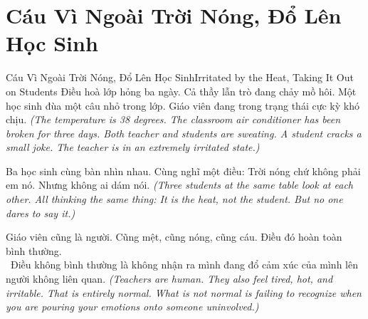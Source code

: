 \section{Cáu Vì Ngoài Trời Nóng, Đổ Lên Học Sinh}
\begin{truyen}{Cáu Vì Ngoài Trời Nóng, Đổ Lên Học Sinh}{Irritated by the Heat, Taking It Out on Students}
 Điều hoà lớp hỏng ba ngày. Cả thầy lẫn trò đang chảy mồ hôi. Một học sinh đùa một câu nhỏ trong lớp. Giáo viên đang trong trạng thái cực kỳ khó chịu.
\textit{(The temperature is 38 degrees. The classroom air conditioner has been broken for three days. Both teacher and students are sweating. A student cracks a small joke. The teacher is in an extremely irritated state.)}




Ba học sinh cùng bàn nhìn nhau. Cùng nghĩ một điều: Trời nóng chứ không phải em nó. Nhưng không ai dám nói.
\textit{(Three students at the same table look at each other. All thinking the same thing: It is the heat, not the student. But no one dares to say it.)}

\begin{baihoc}
Giáo viên cũng là người. Cũng mệt, cũng nóng, cũng cáu. Điều đó hoàn toàn bình thường.\\\
Điều không bình thường là không nhận ra mình đang đổ cảm xúc của mình lên người không liên quan.
\textit{(Teachers are human. They also feel tired, hot, and irritable. That is entirely normal. What is not normal is failing to recognize when you are pouring your emotions onto someone uninvolved.)}
\end{baihoc}
\end{truyen}

